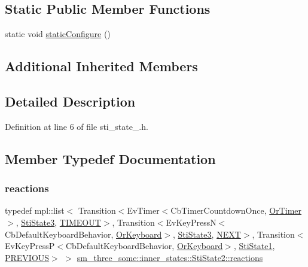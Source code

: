 \subsection*{Static Public Member Functions}
\begin{DoxyCompactItemize}
\item 
static void \hyperlink{structsm__three__some_1_1inner__states_1_1StiState2_a52ec97e0ac51c91508349adf358045ea}{static\+Configure} ()
\end{DoxyCompactItemize}
\subsection*{Additional Inherited Members}


\subsection{Detailed Description}


Definition at line 6 of file sti\+\_\+state\+\_.\+h.



\subsection{Member Typedef Documentation}
\mbox{\label{structsm__three__some_1_1inner__states_1_1StiState2_a35556a3ab61ab56f2aa5d896b8330082}} 
\subsubsection{\texorpdfstring{reactions}{reactions}}
{\footnotesize\ttfamily typedef mpl\+::list$<$ Transition$<$Ev\+Timer$<$Cb\+Timer\+Countdown\+Once, \hyperlink{classsm__three__some_1_1OrTimer}{Or\+Timer}$>$, \hyperlink{structsm__three__some_1_1inner__states_1_1StiState3}{Sti\+State3}, \hyperlink{structsm__three__some_1_1inner__states_1_1StiState2_1_1TIMEOUT}{T\+I\+M\+E\+O\+UT}$>$, Transition$<$Ev\+Key\+PressN$<$Cb\+Default\+Keyboard\+Behavior, \hyperlink{classsm__three__some_1_1OrKeyboard}{Or\+Keyboard}$>$, \hyperlink{structsm__three__some_1_1inner__states_1_1StiState3}{Sti\+State3}, \hyperlink{structsm__three__some_1_1inner__states_1_1StiState2_1_1NEXT}{N\+E\+XT}$>$, Transition$<$Ev\+Key\+PressP$<$Cb\+Default\+Keyboard\+Behavior, \hyperlink{classsm__three__some_1_1OrKeyboard}{Or\+Keyboard}$>$, \hyperlink{structsm__three__some_1_1inner__states_1_1StiState1}{Sti\+State1}, \hyperlink{structsm__three__some_1_1inner__states_1_1StiState2_1_1PREVIOUS}{P\+R\+E\+V\+I\+O\+US}$>$ $>$ \hyperlink{structsm__three__some_1_1inner__states_1_1StiState2_a35556a3ab61ab56f2aa5d896b8330082}{sm\+\_\+three\+\_\+some\+::inner\+\_\+states\+::\+Sti\+State2\+::reactions}}




